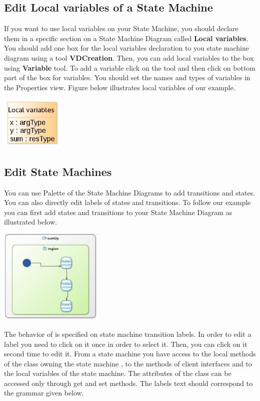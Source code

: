 \documentclass[12pt]{article}
\begin{document}
\subsection{Edit Local variables of a State Machine }
If you want to use local variables on your State Machine, you should declare them in a specific section on a State Machine Diagram called \textbf{Local variables}. You should add one box for the local variables declaration to you state machine diagram using a tool \textbf{VDCreation}. Then, you can add local variables to the box using \textbf{Variable} tool. To add a variable click on the tool and then click on bottom part of the box for variables. You should set the names and types of variables in the Properties view. Figure below illustrates local variables of our example.

     \centerline{
     \includegraphics[width=3cm]{draws/loc-var.png}
     \label{fig:vce-proj}
     }
     
\subsection{Edit State Machines}
You can use Palette of the State Machine Diagrams to add transitions and states. You can also directly edit labels of states and transitions. To follow our example you can first add states and transitions to your State Machine Diagram as illustrated below.

     \centerline{
     \includegraphics[width=5cm]{draws/sm-no-lbl.png}
     \label{fig:vce-proj}
     }
     
The behavior of is specified on state machine transition labels. In order to edit a label you need to click on it once in order to select it. Then, you can click on it second time to edit it. From a state machine you have access to the local methods of the class owning the state machine , to the methods of client interfaces and to the local variables of the state machine. The attributes of the class can be accessed only through get and set methods. The labels text should correspond to the grammar given below.
\end{document}
